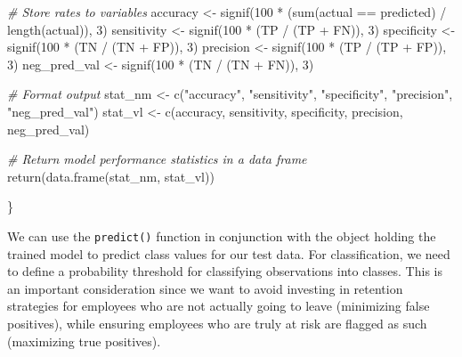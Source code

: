 \documentclass[
]{book}
\newenvironment{Shaded}{\begin{snugshade}}{\end{snugshade}}
\newcommand{\CommentTok}[1]{\textcolor[rgb]{0.56,0.35,0.01}{\textit{#1}}}
\newcommand{\DecValTok}[1]{\textcolor[rgb]{0.00,0.00,0.81}{#1}}
\newcommand{\FunctionTok}[1]{\textcolor[rgb]{0.00,0.00,0.00}{#1}}
\newcommand{\NormalTok}[1]{#1}
\newcommand{\OtherTok}[1]{\textcolor[rgb]{0.56,0.35,0.01}{#1}}
\newcommand{\SpecialCharTok}[1]{\textcolor[rgb]{0.00,0.00,0.00}{#1}}
\newcommand{\StringTok}[1]{\textcolor[rgb]{0.31,0.60,0.02}{#1}}
\begin{document}
\begin{Shaded}
\begin{Highlighting}[]
  \CommentTok{\# Store rates to variables}
\NormalTok{  accuracy }\OtherTok{\textless{}{-}} \FunctionTok{signif}\NormalTok{(}\DecValTok{100} \SpecialCharTok{*}\NormalTok{ (}\FunctionTok{sum}\NormalTok{(actual }\SpecialCharTok{==}\NormalTok{ predicted) }\SpecialCharTok{/} \FunctionTok{length}\NormalTok{(actual)), }\DecValTok{3}\NormalTok{)}
\NormalTok{  sensitivity }\OtherTok{\textless{}{-}} \FunctionTok{signif}\NormalTok{(}\DecValTok{100} \SpecialCharTok{*}\NormalTok{ (TP }\SpecialCharTok{/}\NormalTok{ (TP }\SpecialCharTok{+}\NormalTok{ FN)), }\DecValTok{3}\NormalTok{)}
\NormalTok{  specificity }\OtherTok{\textless{}{-}} \FunctionTok{signif}\NormalTok{(}\DecValTok{100} \SpecialCharTok{*}\NormalTok{ (TN }\SpecialCharTok{/}\NormalTok{ (TN }\SpecialCharTok{+}\NormalTok{ FP)), }\DecValTok{3}\NormalTok{)}
\NormalTok{  precision }\OtherTok{\textless{}{-}} \FunctionTok{signif}\NormalTok{(}\DecValTok{100} \SpecialCharTok{*}\NormalTok{ (TP }\SpecialCharTok{/}\NormalTok{ (TP }\SpecialCharTok{+}\NormalTok{ FP)), }\DecValTok{3}\NormalTok{)}
\NormalTok{  neg\_pred\_val }\OtherTok{\textless{}{-}} \FunctionTok{signif}\NormalTok{(}\DecValTok{100} \SpecialCharTok{*}\NormalTok{ (TN }\SpecialCharTok{/}\NormalTok{ (TN }\SpecialCharTok{+}\NormalTok{ FN)), }\DecValTok{3}\NormalTok{)}
  
  \CommentTok{\# Format output}
\NormalTok{  stat\_nm }\OtherTok{\textless{}{-}} \FunctionTok{c}\NormalTok{(}\StringTok{"accuracy"}\NormalTok{, }\StringTok{"sensitivity"}\NormalTok{, }\StringTok{"specificity"}\NormalTok{, }\StringTok{"precision"}\NormalTok{, }\StringTok{"neg\_pred\_val"}\NormalTok{)}
\NormalTok{  stat\_vl }\OtherTok{\textless{}{-}} \FunctionTok{c}\NormalTok{(accuracy, sensitivity, specificity, precision, neg\_pred\_val)}
  
  \CommentTok{\# Return model performance statistics in a data frame}
  \FunctionTok{return}\NormalTok{(}\FunctionTok{data.frame}\NormalTok{(stat\_nm, stat\_vl))}
  
\NormalTok{\}}
\end{Highlighting}
\end{Shaded}

We can use the \texttt{predict()} function in conjunction with the object holding the trained model to predict class values for our test data. For classification, we need to define a probability threshold for classifying observations into classes. This is an important consideration since we want to avoid investing in retention strategies for employees who are not actually going to leave (minimizing false positives), while ensuring employees who are truly at risk are flagged as such (maximizing true positives).
\end{document}
